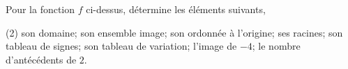 %
%
    \begin{center}
        
    \end{center}
    Pour la fonction $f$ ci-dessus, détermine les éléments suivants,
    \begin{tasks}(2)
        \task son domaine;
        \task son ensemble image;
        \task son ordonnée à l'origine;
        \task ses racines;
        \task son tableau de signes;
        \task son tableau de variation;
        \task l'image de $-4$;
        \task le nombre d'antécédents de $2$.
    \end{tasks}
